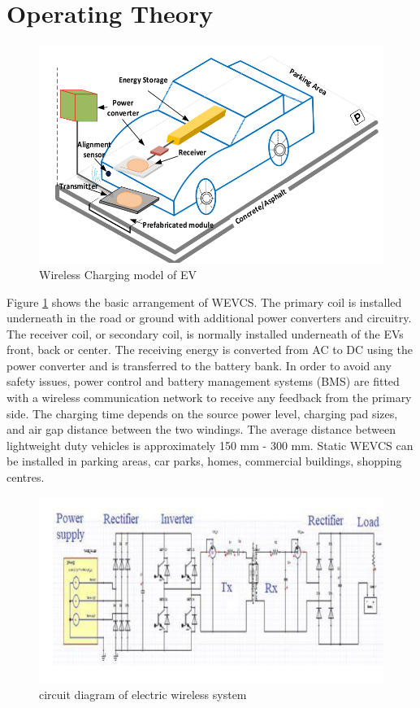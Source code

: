 \documentclass[12pt]{article}
\begin{document}
\section{Operating Theory}
\begin{figure}[h]
	\centering
	\includegraphics[scale =0.75]{imgs/static.png}
	\caption{Wireless Charging model of EV}
	\label{fig:WEV}
\end{figure}
Figure \ref{fig:WEV} shows the basic arrangement of WEVCS. The primary coil is installed underneath in the road or ground with additional power converters and circuitry. The receiver coil, or secondary coil, is normally installed underneath of the EVs front, back
or center. The receiving energy is converted from AC to DC using the power converter and is transferred to the battery bank. In order to avoid any safety issues, power control and battery management systems (BMS) are fitted with a wireless communication network to receive any feedback from the primary side. The charging time depends on the source power level, charging pad sizes, and air gap distance between the two windings. The average distance between lightweight duty vehicles is approximately 150 mm - 300 mm. Static WEVCS can be installed in parking areas, car parks, homes, commercial buildings, shopping centres. \cite{pl2018}
\begin{figure}[h]
	\centering
	\includegraphics{imgs/circuit.png}
	\caption{circuit diagram of electric wireless system}
	\label{fig:ckt}
\end{figure}
 \newpage 
  


\end{document}
